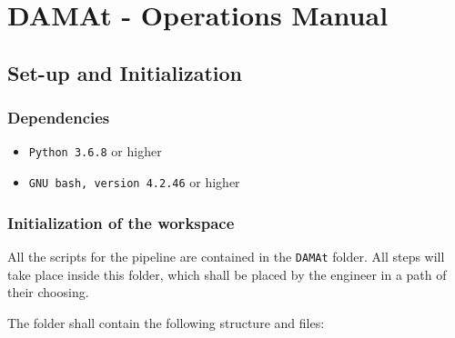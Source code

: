 
\chapter{DAMAt - Operations Manual}
\label{chapter:dama:operations}

\section{Set-up and Initialization}
\label{sec:dama_setup}
\subsection{Dependencies}

\begin{itemize}
	\item \texttt{Python 3.6.8} or higher
	\item \texttt{GNU bash, version 4.2.46} or higher
\end{itemize}

\subsection{Initialization of the \DAMA workspace}

All the scripts for the \DAMA pipeline are contained in the \texttt{DAMAt} folder.
All \DAMA steps will take place inside this folder, which shall be placed by the engineer in a path of their choosing.

The folder shall contain the following structure and files:

